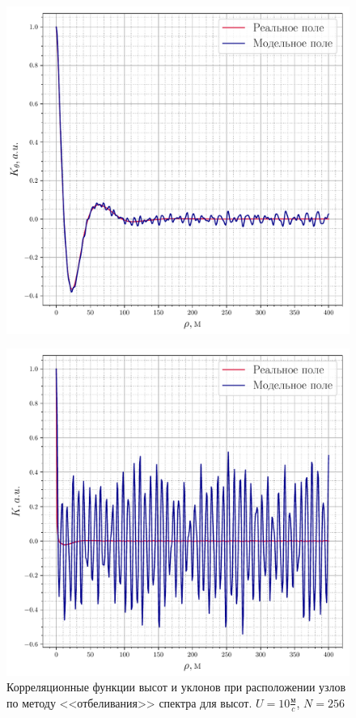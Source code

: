 \begin{figure}[H]
	\begin{minipage}{0.49\linewidth}
			\centering
			\includegraphics[width=\linewidth]{fig/correlation_height_height2.pdf}
			\label{fig:ch22}		
	\end{minipage}
	\hfill
	\begin{minipage}{0.49\linewidth}
			\centering
			\includegraphics[width=\linewidth]{fig/correlation_angles_height2.pdf}
	\end{minipage}
	\caption{Корреляционные функции высот и уклонов при расположении узлов по методу <<отбеливания>> спектра для высот. $U=10 \frac{\text{м}}{c}$, $N=256$}
			\label{fig:ca22}		
\end{figure}
